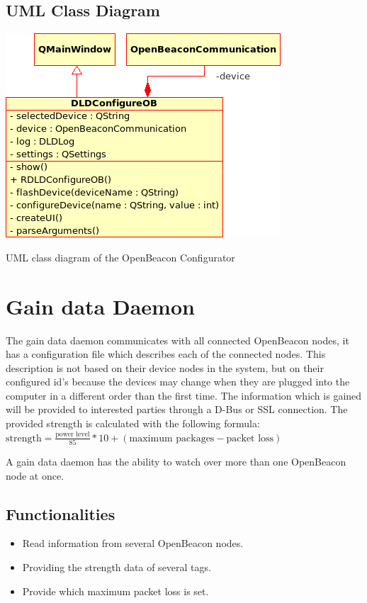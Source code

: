    \subsection{UML Class Diagram}
    \begin{staticFigure}
     \centering
     \includegraphics[scale=0.7]{UMLDiagrams/dldConfigureOB.png}
     \caption{UML class diagram of the OpenBeacon Configurator}
     \label{fg:projectModularization:OBConfigUML}
    \end{staticFigure}

  \section{Gain data Daemon}
   \label{sec:design:gainDaemon}
    The gain data daemon communicates with all connected OpenBeacon nodes, it has a configuration file which describes each of the connected nodes. This description is not based on their device nodes in the system, but on their configured id's because the devices may change when they are plugged into the computer in a different order than the first time. The information which is gained will be provided to interested parties through a D-Bus or SSL connection. The provided strength is calculated with the following formula: $\textrm{strength} = \frac{\textrm{power level}}{85} * 10 + \left(\textrm{maximum packages} - \textrm{packet loss}\right)$

    A gain data daemon has the ability to watch over more than one OpenBeacon node at once. 

   \subsection{Functionalities}
    \begin{itemize}
     \item Read information from several OpenBeacon nodes.
     \item Providing the strength data of several tags.
     \item Provide which maximum packet loss is set.
    \end{itemize}

